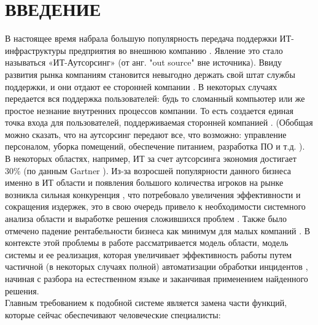 \chapter*{ВВЕДЕНИЕ}							%

В настоящее время набрала большую популярность передача поддержки ИТ-инфраструктуры предприятия во внешнюю компанию \cite{StartToOutsource}. Явление это стало называться «ИТ-Аутсорсинг» (от анг. "out source" \- вне источника). Ввиду развития рынка компаниям становится невыгодно держать свой штат службы поддержки, и они отдают ее сторонней компании \cite{OutsourceEff}. В некоторых случаях передается вся поддержка пользователей: будь то сломанный компьютер или же простое незнание внутренних процессов компании. То есть создается единая точка входа для пользователей, поддерживаемая сторонней компанией \cite{OutsourceSD}. (Обобщая можно сказать, что на аутсорсинг передают все, что возможно: управление персоналом, уборка помещений, обеспечение питанием, разработка ПО \cite{OutsourceSoft} и т.д. ).\\ В некоторых областях, например, ИТ за счет аутсорсинга экономия достигает 30\% (по данным Gartner \cite{OutsourceIT}).
Из-за возросшей популярности данного бизнеса именно в ИТ области и появления большого количества игроков на рынке возникла сильная конкуренция \cite{AUTOS-1}, что потребовало увеличения эффективности и сокращения издержек, это в свою очередь привело к необходимости системного анализа области и выработке решения сложившихся проблем \cite{AUTOM-1}. Также было отмечено падение рентабельности бизнеса как минимум для малых компаний \cite{OUTSOURCE-RENT} \cite{OutsourceEff}. В контексте этой проблемы в работе рассматривается модель области, модель системы и ее реализация, которая увеличивает эффективность работы путем частичной (в некоторых случаях полной) автоматизации обработки инцидентов \cite{SDAUTOM}, начиная с разбора на естественном языке и заканчивая применением найденного решения. \\
Главным требованием к подобной системе является замена части функций, которые сейчас обеспечивают человеческие специалисты:
